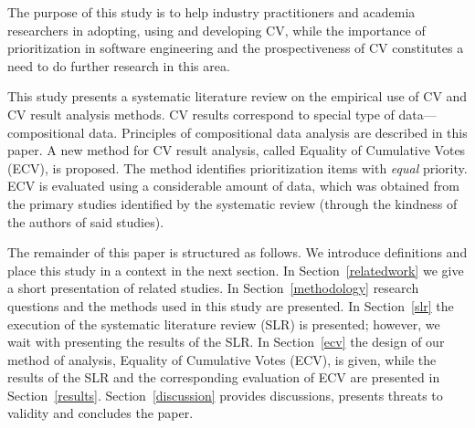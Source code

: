 The purpose of this study is to help industry practitioners and academia researchers in adopting, using and developing CV, while the importance of prioritization in software engineering and the prospectiveness of CV constitutes a need to do further research in this area.

This study presents a systematic literature review on the empirical use of CV and CV result analysis methods.
CV results correspond to special type of data---compositional data. Principles of compositional data analysis are described in this paper.
A new method for CV result analysis, called Equality of Cumulative Votes (ECV), is proposed.
The method identifies prioritization items with \emph{equal} priority.
ECV is evaluated using a considerable amount of data, which was obtained from the primary studies identified by the systematic review (through the kindness of the authors of said studies).

The remainder of this paper is structured as follows. We introduce definitions and place this study in a context in the next section. In Section~\ref{relatedwork} we give a short presentation of related studies. In Section~\ref{methodology} research questions and the methods used in this study are presented. In Section~\ref{slr} the execution of the systematic literature review (SLR) is presented; however, we wait with presenting the results of the SLR. In Section~\ref{ecv} the design of our method of analysis, Equality of Cumulative Votes (ECV), is given, while the results of the SLR and the corresponding evaluation of ECV are presented in Section~\ref{results}. Section~\ref{discussion} provides discussions, presents threats to validity and concludes the paper.
